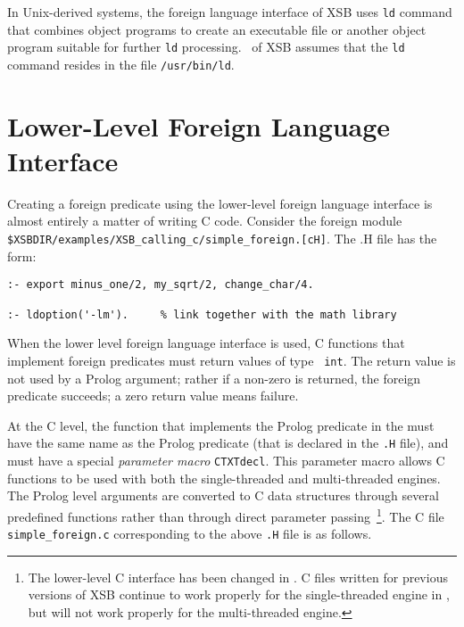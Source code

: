 In Unix-derived systems, the foreign language interface of XSB uses
{\tt ld} command that combines object programs to create an executable
file or another object program suitable for further {\tt ld}
processing. \version\ of XSB assumes that the {\tt ld} command resides
in the file {\tt /usr/bin/ld}.

\section{Lower-Level Foreign Language Interface}

Creating a foreign predicate using the lower-level foreign language
interface is almost entirely a matter of writing C code.  Consider the
foreign module {\tt
  \$XSBDIR/examples/XSB\_calling\_c/simple\_foreign.[cH]}.  The .H file
has the form: 

\begin{verbatim}
:- export minus_one/2, my_sqrt/2, change_char/4.

:- ldoption('-lm').     % link together with the math library
\end{verbatim}

When the lower level foreign language interface is used, C functions
that implement foreign predicates must return values of type {\tt
  int}.  The return value is not used by a Prolog argument; rather if
a non-zero is returned, the foreign predicate succeeds; a zero return
value means failure.

At the C level, the function that implements the Prolog predicate in
the must have the same name as the Prolog predicate (that is declared
in the {\tt *.H} file), and must have a special {\em parameter macro}
{\tt CTXTdecl}.  This parameter macro allows C functions to be used
with both the single-threaded and multi-threaded engines.  The Prolog
level arguments are converted to C data structures through several
predefined functions rather than through direct parameter
passing~\footnote{The lower-level C interface has been changed in
  \version .  C files written for previous versions of XSB continue to
  work properly for the single-threaded engine in \version , but will
  not work properly for the multi-threaded engine.}.  The C file {\tt
  simple\_foreign.c} corresponding to the above {\tt .H} file is as
follows.


